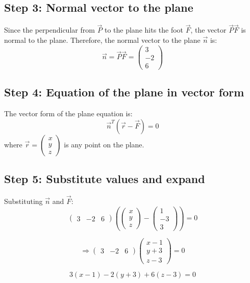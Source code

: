 \documentclass[journal]{IEEEtran}
\begin{document}
\subsection*{\textbf{Step 3}: Normal vector to the plane}
Since the perpendicular from \(\vec{P}\) to the plane hits the foot \(\vec{F}\), the vector \(\vec{P}\vec{F}\) is normal to the plane. Therefore, the normal vector to the plane \(\vec{n}\) is:
\[
\vec{n} = \vec{P}\vec{F} = \begin{pmatrix} 3 \\ -2 \\ 6 \end{pmatrix}
\]

\subsection*{\textbf{Step 4}: Equation of the plane in vector form}
The vector form of the plane equation is:
\[
\vec{n}^T (\vec{r} - \vec{F}) = 0
\]
where \(\vec{r} = \begin{pmatrix} x \\ y \\ z \end{pmatrix}\) is any point on the plane.

\subsection*{\textbf{Step 5}: Substitute values and expand}
Substituting \(\vec{n}\) and \(\vec{F}\):
\[
\begin{pmatrix} 3 & -2 & 6 \end{pmatrix} \left( \begin{pmatrix} x \\ y \\ z \end{pmatrix} - \begin{pmatrix} 1 \\ -3 \\ 3 \end{pmatrix} \right) = 0
\]

\[
\Rightarrow \begin{pmatrix} 3 & -2 & 6 \end{pmatrix} \begin{pmatrix} x-1 \\ y+3 \\ z-3 \end{pmatrix} = 0
\]

\[
3(x-1) - 2(y+3) + 6(z-3) = 0
\]
\end{document}
